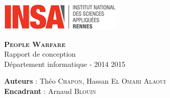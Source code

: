 \documentclass[a4paper,11pt]{article}
\begin{document}
  

\begin{titlepage}
\date{\today}
\begin{minipage}[t]{0.5\textwidth}
\begin{flushleft}
\centering
\hspace{-5cm}
\includegraphics[width=\textwidth]{fig/logoINSA}
\end{flushleft}
\end{minipage}
\vspace{8cm}
\begin{center}
\textsc{\LARGE \bfseries People Warfare}\\[0.25cm]
		{\LARGE Rapport de conception}\\[0.25cm]
{  \Large Département informatique - 2014 2015}\\[2cm]
\vspace{4cm}
\begin{minipage}[t]{\textwidth}
\begin{flushleft} \large
\vspace{3cm}
\textbf{Auteurs} :
        Théo \textsc{Chapon},
        Hassan \textsc{El Omari Alaoui} 
        \\
\textbf{Encadrant} : Arnaud \textsc{Blouin}
\end{flushleft}
\end{minipage}
\end{center}



 \end{titlepage} 


\thispagestyle{empty}      %


\newpage
\mbox{}\\
\newpage
\thispagestyle{empty}

\tableofcontents
\newpage
\setcounter{page}{1}
\end{document}
